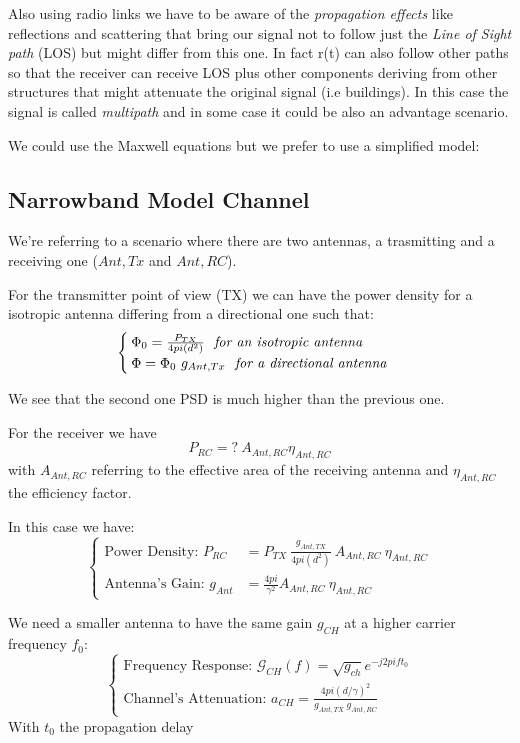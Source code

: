 Also using radio links we have to be aware of the \textit{propagation effects} like reflections and scattering that bring our signal not to follow just the \textit{Line of Sight path} (LOS) but might differ from this one. In fact r(t) can also follow other paths so that the receiver can receive LOS plus other components deriving from other structures that might attenuate the original signal (i.e buildings). In this case the signal is called \textit{multipath} and in some case it could be also an advantage scenario.

We could use the Maxwell equations but we prefer to use a simplified model:
\subsection{Narrowband Model Channel}
We're referring to a scenario where there are two antennas, a trasmitting and a receiving one ($Ant,Tx$ and $Ant,RC$).

For the transmitter point of view (TX) we can have the power density for a isotropic antenna differing from a directional one such that:
\begin{equation}
\begin{cases}
\Phi_0 = \frac{P_{TX}}{4pi(d^2)} \ \text{ \textit{for an isotropic antenna}}\\
\Phi = \Phi_0 \ g_{Ant,Tx} \ \text{ \textit{for a directional antenna}}
\end{cases}
\end{equation}

We see that the second one PSD is much higher than the previous one.

For the receiver we have
\begin{equation}
P_{RC} = ? \ A_{Ant,RC} \eta_{Ant,RC}
\end{equation}
with $A_{Ant,RC}$ referring to the effective area of the receiving antenna and $\eta_{Ant,RC}$ the efficiency factor.

In this case we have:
\begin{equation}
\begin{cases}
\text{Power Density: } P_{RC} &= P_{TX}\ \frac{g_{Ant,TX}}{4pi(d^2)}\ A_{Ant,RC}\ \eta_{Ant,RC}\\
\text{Antenna's Gain: } g_{Ant} &= \frac{4pi}{\gamma^2} A_{Ant,RC} \ \eta_{Ant,RC}
\end{cases}
\end{equation}

We need a smaller antenna to have the same gain $g_{CH}$ at a higher carrier frequency $f_0$:
\begin{equation}
\begin{cases}
\text{Frequency Response: } \mathcal{G}_{CH} (f) = \sqrt{g_{ch}} e^{-j2pif{t_0}}\\
\text{Channel's Attenuation: } a_{CH} = \frac{4pi(d/\gamma)^2}{g_{Ant,TX}\ g_{Ant,RC}}
\end{cases}
\end{equation}
With $t_0$ the propagation delay

